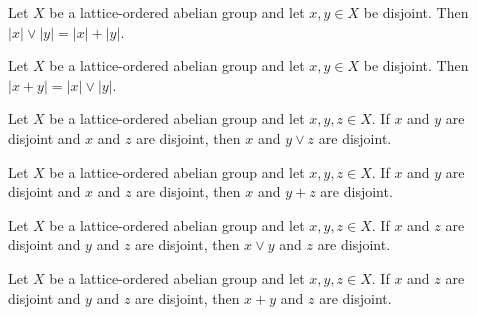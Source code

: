 \begin{lemma}
\label{lem:sup-abs-eq-add-abs-of-isVLDisjoint}
\leanok
{}
Let $X$ be a lattice-ordered abelian group and let $x, y \in X$ be
disjoint. Then $\lvert x \rvert \vee \lvert y \rvert = \lvert x \rvert
+ \lvert y \rvert$.
\end{lemma}

\begin{lemma}
\label{lem:abs-add-eq-sup-abs-of-isVLDisjoint}
\leanok
{}
Let $X$ be a lattice-ordered abelian group and let $x, y \in X$ be
disjoint. Then $\lvert x + y \rvert = \lvert x \rvert \vee \lvert y
\rvert$.
\end{lemma}

\begin{lemma}
\label{lem:isVLDisjoint-sup-right}
\leanok
{}
Let $X$ be a lattice-ordered abelian group and let $x, y, z \in X$. If
$x$ and $y$ are disjoint and $x$ and $z$ are disjoint, then $x$ and
$y \vee z$ are disjoint.
\end{lemma}

\begin{lemma}
\label{lem:isVLDisjoint-add-right}
\leanok
{}
Let $X$ be a lattice-ordered abelian group and let $x, y, z \in X$. If
$x$ and $y$ are disjoint and $x$ and $z$ are disjoint, then $x$ and
$y + z$ are disjoint.
\end{lemma}

\begin{lemma}
\label{lem:isVLDisjoint-sup-left}
\leanok
{}
Let $X$ be a lattice-ordered abelian group and let $x, y, z \in X$. If
$x$ and $z$ are disjoint and $y$ and $z$ are disjoint, then $x \vee y$
and $z$ are disjoint.
\end{lemma}

\begin{lemma}
\label{lem:isVLDisjoint-add-left}
\leanok
{}
Let $X$ be a lattice-ordered abelian group and let $x, y, z \in X$. If
$x$ and $z$ are disjoint and $y$ and $z$ are disjoint, then $x + y$ and
$z$ are disjoint.
\end{lemma}

